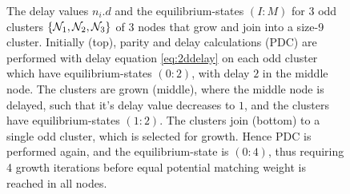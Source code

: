 \begin{figure}[htbp]
\begin{tikzpicture}[on grid, scale=1]
    \end{tikzpicture}
    \caption{The delay values $n_i.d$ and the equilibrium-states $(I:M)$ for 3 odd clusters $\{\nset_1, \nset_2, \nset_3\}$ of 3 nodes that grow and join into a size-9 cluster. Initially (top), parity and delay calculations (PDC) are performed with delay equation \eqref{eq:2ddelay} on each odd cluster which have equilibrium-states $(0:2)$, with delay $2$ in the middle node. The clusters are grown (middle), where the middle node is delayed, such that it's delay value decreases to $1$, and the clusters have equilibrium-states $(1:2)$. The clusters join (bottom) to a single odd cluster, which is selected for growth. Hence PDC is performed again, and the equilibrium-state is $(0:4)$, thus requiring 4 growth iterations before equal potential matching weight is reached in all nodes.}\label{fig:kbloom}
\end{figure}

